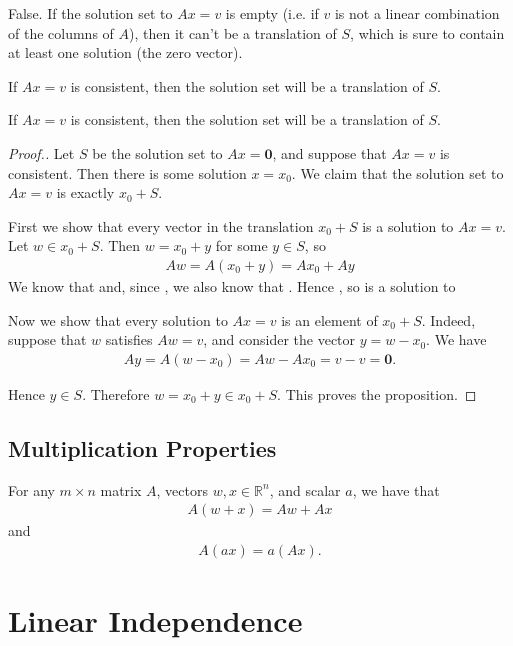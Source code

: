 \documentclass{package/notes}
\begin{document}
False. If the solution set to $Ax=v$ is empty (i.e. if $v$ is not a linear combination of the columns of $A$), then it can't be a translation of $S$, which is sure to contain at least one solution (the zero vector).

If $Ax=v$ is consistent, then the solution set will be a translation of $S$.

\begin{proposition}
    
    If $Ax=v$ is consistent, then the solution set will be a translation of $S$.
\end{proposition}


\begin{proof}[Proof.]

Let $S$ be the solution set to $Ax=\boldsymbol{0}$, and suppose that $Ax=v$ is consistent. Then there is some solution $x=x_0$. We claim that the solution set to $Ax=v$ is exactly $x_0+S$.

First we show that every vector in the translation $x_0+S$ is a solution to $Ax=v$. Let $w\in x_0+S$. Then $w=x_0+y$ for some $y\in S$, so
\begin{align*}
    Aw=A(x_0+y)=Ax_0+Ay
\end{align*}
We know that  and, since , we also know that . Hence , so  is a solution to 

Now we show that every solution to $Ax=v$ is an element of $x_0+S$. Indeed, suppose that $w$ satisfies $Aw=v$, and consider the vector $y=w-x_0$. We have
\begin{align*}
    Ay=A(w-x_0)=Aw-Ax_0=v-v=\boldsymbol{0}.
\end{align*}

Hence $y\in S$. Therefore $w=x_0+y\in x_0+S$. This proves the proposition.
\end{proof}
\subsection{Multiplication Properties}
For any $m\times n$ matrix $A$, vectors $w,x\in \mathbb{R}^n$, and scalar $a$, we have that
\begin{align*}
    A(w+x)=Aw+Ax
\end{align*}
and
\begin{align*}
    A(ax)=a(Ax).
\end{align*}

\section{Linear Independence}
\end{document}
